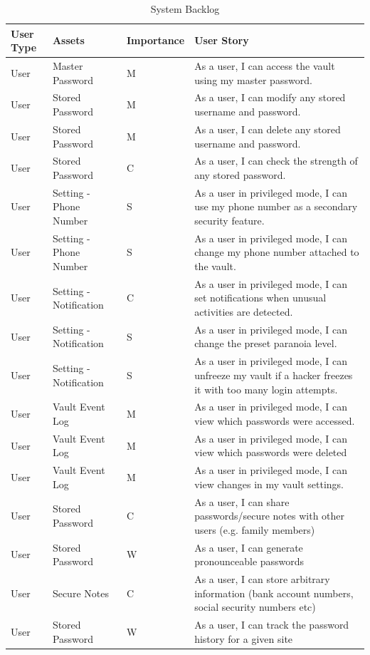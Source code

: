 \documentclass{article}
\begin{document}
\begin{table}[H]
  \centering
  {
    \renewcommand\arraystretch{1.25}
    \begin{tabular}{>{\centering}m{1cm} >{\centering}m{4cm} >{\centering}m{2cm} >{\centering\arraybackslash}m{8cm} }
    \toprule
    User Type & Assets & Importance & User Story \\
    \midrule
    User & Master Password & M & As a user, I can access the vault using my master password. \\
    User & Stored Password & M & As a user, I can modify any stored username and password. \\
    User & Stored Password & M & As a user, I can delete any stored username and password. \\
    User & Stored Password & C & As a user, I can check the strength of any stored password. \\
    User & Setting - Phone Number & S & As a user in privileged mode, I can use my phone number as a secondary security feature. \\
    User & Setting - Phone Number & S & As a user in privileged mode, I can change my phone number attached to the vault. \\
    User & Setting - Notification & C & As a user in privileged mode, I can set notifications when unusual activities are detected. \\
    User & Setting - Notification & S &  As a user in privileged mode, I can change the preset paranoia level. \\
    User & Setting - Notification & S & As a user in privileged mode, I can unfreeze my vault if a hacker freezes it with too many login attempts. \\
    User & Vault Event Log & M & As a user in privileged mode, I can view which passwords were accessed. \\
    User & Vault Event Log & M & As a user in privileged mode, I can view which passwords were deleted \\
    User & Vault Event Log & M & As a user in privileged mode, I can view changes in my vault settings. \\
    User & Stored Password & C & As a user, I can share passwords/secure notes with other users (e.g. family members) \\
    User & Stored Password & W & As a user, I can generate pronounceable passwords \\
    User & Secure Notes & C & As a user, I can store arbitrary information (bank account numbers, social security numbers etc) \\
    User & Stored Password & W & As a user, I can track the password history for a given site \\
    \bottomrule
    \end{tabular}
  }
  \caption{System Backlog}
  \label{tab:system_backlog}
\end{table}
\end{document}
